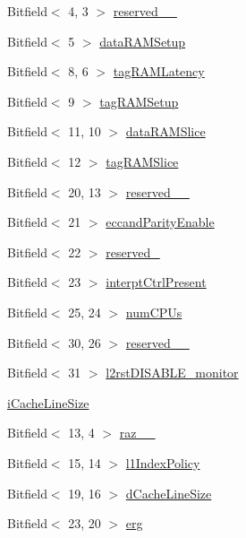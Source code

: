 \begin{DoxyCompactItemize}
\item 
Bitfield$<$ 4, 3 $>$ \hyperlink{namespaceArmISA_a2c3c2c0e70a427a2fbff0835c9d46a5d}{reserved\_\_}
\item 
Bitfield$<$ 5 $>$ \hyperlink{namespaceArmISA_ae602a6014e9d3ec57f03dcc7906c3963}{dataRAMSetup}
\item 
Bitfield$<$ 8, 6 $>$ \hyperlink{namespaceArmISA_a2673c4bab12a4270b0555bc9716ae414}{tagRAMLatency}
\item 
Bitfield$<$ 9 $>$ \hyperlink{namespaceArmISA_a587f3989f075832f147521f38cf70c90}{tagRAMSetup}
\item 
Bitfield$<$ 11, 10 $>$ \hyperlink{namespaceArmISA_a291fe9a4f4035b710fa2fe1bc7ab9b82}{dataRAMSlice}
\item 
Bitfield$<$ 12 $>$ \hyperlink{namespaceArmISA_a5e4f5974e6df3b4a678e4b3c53c9a38f}{tagRAMSlice}
\item 
Bitfield$<$ 20, 13 $>$ \hyperlink{namespaceArmISA_a1db5b9576a09dd4f40668194a423e91a}{reserved\_\_}
\item 
Bitfield$<$ 21 $>$ \hyperlink{namespaceArmISA_a73975970bdbe1d9b883b8f3a9dc13c18}{eccandParityEnable}
\item 
Bitfield$<$ 22 $>$ \hyperlink{namespaceArmISA_a7dab078253228171483b84a7d45ea9a4}{reserved\_}
\item 
Bitfield$<$ 23 $>$ \hyperlink{namespaceArmISA_a48a534c8532e02c7c878b6ffa7bc8797}{interptCtrlPresent}
\item 
Bitfield$<$ 25, 24 $>$ \hyperlink{namespaceArmISA_aae77f5bbeda95be5744dd0d73d9704b8}{numCPUs}
\item 
Bitfield$<$ 30, 26 $>$ \hyperlink{namespaceArmISA_a65b73597af966d5989b346242ef71cb6}{reserved\_\_}
\item 
Bitfield$<$ 31 $>$ \hyperlink{namespaceArmISA_a941b2a70f9add998468e7f263c353f3e}{l2rstDISABLE\_\-monitor}
\item 
\hyperlink{namespaceArmISA_a0c58a5ca9fed0e73d6bdddd3d71bce83}{iCacheLineSize}
\item 
Bitfield$<$ 13, 4 $>$ \hyperlink{namespaceArmISA_a7933f7cf922fc425eb83b7d329cae065}{raz\_\_}
\item 
Bitfield$<$ 15, 14 $>$ \hyperlink{namespaceArmISA_a0cdfcd3fedb8dc381faf5f8c23aad854}{l1IndexPolicy}
\item 
Bitfield$<$ 19, 16 $>$ \hyperlink{namespaceArmISA_a5133a8075e6f4a42f3c3359d9da345f8}{dCacheLineSize}
\item 
Bitfield$<$ 23, 20 $>$ \hyperlink{namespaceArmISA_ad8ede17106366eceb921efde2a2b0576}{erg}

\end{DoxyCompactItemize}
